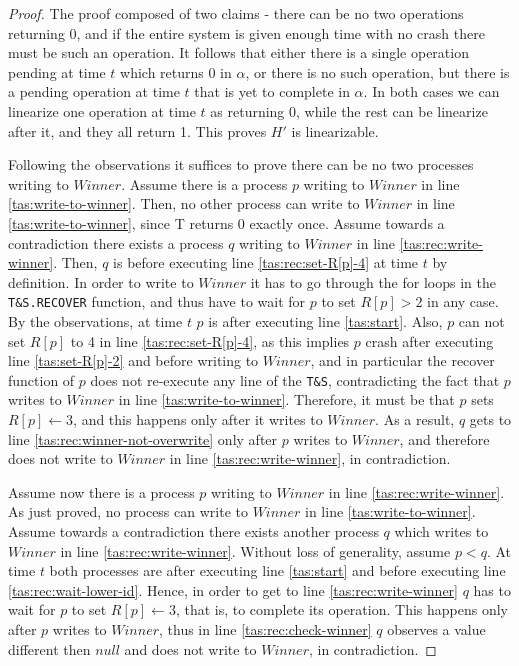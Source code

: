 \begin{proof}
	
	The proof composed of two claims - there can be no two operations returning 0, and if the entire system is given enough time with no crash there must be such an operation. It follows that either there is a single operation pending at time $t$ which returns 0 in $\alpha$, or there is no such operation, but there is a pending operation at time $t$ that is yet to complete in $\alpha$. In both cases we can linearize one operation at time $t$ as returning 0, while the rest can be linearize after it, and they all return 1. This proves $H'$ is linearizable.
	
	Following the observations it suffices to prove there can be no two processes writing to $Winner$.
	Assume there is a process $p$ writing to $Winner$ in line \ref{tas:write-to-winner}. Then, no other process can write to $Winner$ in line \ref{tas:write-to-winner}, since T returns 0 exactly once.
	Assume towards a contradiction there exists a process $q$ writing to $Winner$ in line \ref{tas:rec:write-winner}. Then, $q$ is before executing line \ref{tas:rec:set-R[p]-4} at time $t$ by definition. In order to write to $Winner$ it has to go through the for loops in the \texttt{T\&S.RECOVER} function, and thus have to wait for $p$ to set $R[p] > 2$ in any case. By the observations, at time $t$ $p$ is after executing line \ref{tas:start}. Also, $p$ can not set $R[p]$ to 4 in line \ref{tas:rec:set-R[p]-4}, as this implies $p$ crash after executing line \ref{tas:set-R[p]-2} and before writing to $Winner$, and in particular the recover function of $p$ does not re-execute any line of the \texttt{T\&S}, contradicting the fact that $p$ writes to $Winner$ in line \ref{tas:write-to-winner}. Therefore, it must be that $p$ sets $R[p] \gets 3$, and this happens only after it writes to $Winner$. As a result, $q$ gets to line \ref{tas:rec:winner-not-overwrite} only after $p$ writes to $Winner$, and therefore does not write to $Winner$ in line \ref{tas:rec:write-winner}, in contradiction.
	
	Assume now there is a process $p$ writing to $Winner$ in line \ref{tas:rec:write-winner}. As just proved, no process can write to $Winner$ in line \ref{tas:write-to-winner}. Assume towards a contradiction there exists another process $q$ which writes to $Winner$ in line \ref{tas:rec:write-winner}. Without loss of generality, assume $p < q$. At time $t$ both processes are after executing line \ref{tas:start} and before executing line \ref{tas:rec:wait-lower-id}. Hence, in order to get to line \ref{tas:rec:write-winner} $q$ has to wait for $p$ to set $R[p] \gets 3$, that is, to complete its operation. This happens only after $p$ writes to $Winner$, thus in line \ref{tas:rec:check-winner} $q$ observes a value different then $null$ and does not write to $Winner$, in contradiction.


\end{proof}
